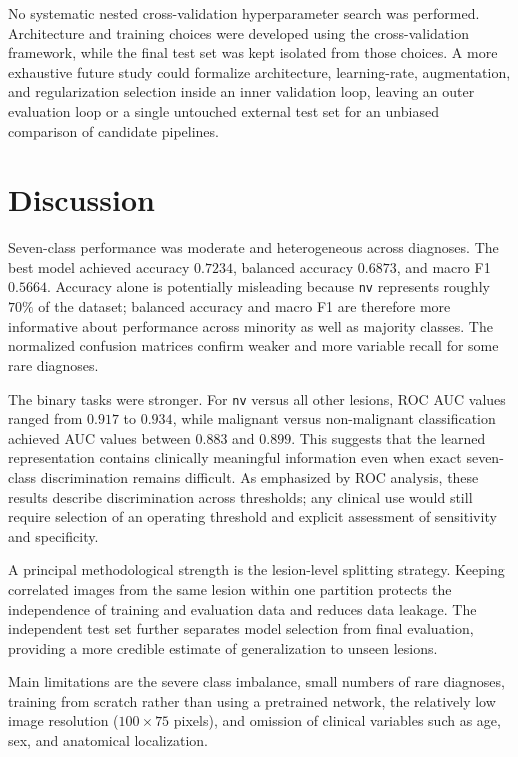 \documentclass[11pt,a4paper]{article}
\begin{document}
No systematic nested cross-validation hyperparameter search was performed. Architecture and training choices were developed using the cross-validation framework, while the final test set was kept isolated from those choices. A more exhaustive future study could formalize architecture, learning-rate, augmentation, and regularization selection inside an inner validation loop, leaving an outer evaluation loop or a single untouched external test set for an unbiased comparison of candidate pipelines.

\section{Discussion}
Seven-class performance was moderate and heterogeneous across diagnoses. The best model achieved accuracy $0.7234$, balanced accuracy $0.6873$, and macro F1 $0.5664$. Accuracy alone is potentially misleading because \texttt{nv} represents roughly $70\%$ of the dataset; balanced accuracy and macro F1 are therefore more informative about performance across minority as well as majority classes. The normalized confusion matrices confirm weaker and more variable recall for some rare diagnoses.

The binary tasks were stronger. For \texttt{nv} versus all other lesions, ROC AUC values ranged from $0.917$ to $0.934$, while malignant versus non-malignant classification achieved AUC values between $0.883$ and $0.899$. This suggests that the learned representation contains clinically meaningful information even when exact seven-class discrimination remains difficult. As emphasized by ROC analysis, these results describe discrimination across thresholds; any clinical use would still require selection of an operating threshold and explicit assessment of sensitivity and specificity.

A principal methodological strength is the lesion-level splitting strategy. Keeping correlated images from the same lesion within one partition protects the independence of training and evaluation data and reduces data leakage. The independent test set further separates model selection from final evaluation, providing a more credible estimate of generalization to unseen lesions.

Main limitations are the severe class imbalance, small numbers of rare diagnoses, training from scratch rather than using a pretrained network, the relatively low image resolution ($100\times75$ pixels), and omission of clinical variables such as age, sex, and anatomical localization.
\end{document}
